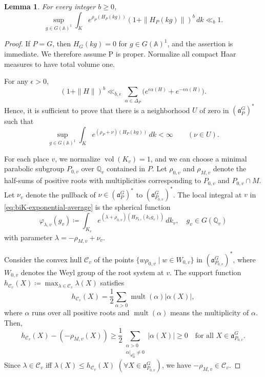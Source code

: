 \documentclass[12pt]{amsart}
\theoremstyle{definition}
\theoremstyle{plain}
\newtheorem{lemma}[definition]{Lemma}
\theoremstyle{remark}
\def\Q{\mathbb{Q}}%
\def\A{\mathbb{A}}%
\DeclareMathOperator{\vol}{vol}%
\newcommand{\fa}{\mathfrak{a}}
\newcommand{\cC}{\mathcal{C}}
\numberwithin{equation}{section}
\newcommand{\sC}{\mathscr{C}}
\begin{document}
\begin{lemma}\label{lem:biK-spherical-moment}
For every integer \(b\ge0\),
\begin{equation*}
\sup_{g\in G(\A)^1}
\int_K e^{\rho_P(H_P(kg))}
       (1+\|H_P(kg)\|)^b\,dk \ll_b 1.
\end{equation*}
\end{lemma}
\begin{proof}
If $P=G$, then $H_G(kg)=0$ for $g \in G(\A)^1$, and the assertion is immediate.
We therefore assume P is proper.
Normalize all compact Haar measures to have total volume one.

For any $\epsilon>0$, 
\[
(1+\|H\|)^b
\ll_{b,\epsilon}
\sum_{\alpha\in\Delta_P}\bigl(e^{\epsilon\alpha(H)}
           +e^{-\epsilon\alpha(H)}\bigr).
\]
Hence, it is sufficient to prove that there is a neighborhood $U$ of zero in
$(\fa_P^G)^*$ such that
\begin{equation}\label{eq:biK-exponential-average}
\sup_{g\in G(\A)^1}
\int_K e^{(\rho_P+\nu)(H_P(kg))}\,dk<\infty
\qquad(\nu\in U).
\end{equation}


For each place $v$, we normalize $\vol(K_v)=1$, and we can choose a minimal parabolic subgroup $P_{0,v}$ over $\Q_v$ contained in $P$.
Let $\rho_{0,v}$ and $\rho_{M,v}$ denote the half-sums of positive roots with multiplicities corresponding to $P_{0,v}$ and $P_{0,v}\cap M$.  
Let $\nu_v$ denote the pullback of $\nu\in(\fa_P^G)^*$ to $(\fa_{P_{0,v}}^G)^*$.
The local integral at $v$ in \eqref{eq:biK-exponential-average} is the spherical function
\[
\varphi_{\lambda,v}(g_v) \coloneqq  \int_{K_v}e^{(\lambda+\rho_{0,v})(H_{P_{0,v}}(k_vg_v))}\,dk_v, \quad g_v\in G(\Q_v) 
\]
with parameter $\lambda=-\rho_{M,v}+\nu_v$. 


Consider the convex hull $\sC_v$ of the points $\{ w \rho_{0,v} \mid w\in W_{0,v}\}$ in $(\fa_{P_{0,v}}^G)^*$, where $W_{0,v}$ denotes the Weyl group of the root system at $v$.  
The support function $h_{\sC_v}(X)\coloneqq \max_{\lambda\in\sC_v}\lambda(X)$ satisfies 
\[
h_{\sC_v}(X)=\frac12\sum_{\alpha>0}\operatorname{mult}(\alpha)|\alpha(X)|, 
\]
where $\alpha$ runs over all positive roots and $\operatorname{mult}(\alpha)$ means the multiplicity of $\alpha$.
Then,
\[
h_{\sC_v}(X)-(-\rho_{M,v}(X))\ge \frac{1}{2}\sum_{\substack{\alpha>0\\ \alpha|_{\fa_M^G}\neq 0 }}|\alpha(X)|\ge 0 \quad \text{for all $X\in \fa_{P_{0,v}}^G$.}
\]
Since $\lambda\in \sC_v$ iff $\lambda(X)\le h_{\cC_v}(X)$ $(\forall X\in \fa_{P_{0,v}}^G)$, we have $-\rho_{M,v}\in\sC_v$. 



\end{proof}
\end{document}
